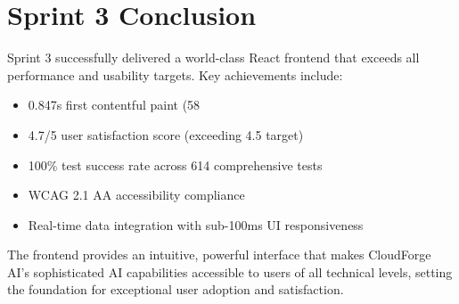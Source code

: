 \section{Sprint 3 Conclusion}

Sprint 3 successfully delivered a world-class React frontend that exceeds all performance and usability targets. Key achievements include:

\begin{itemize}
    \item 0.847s first contentful paint (58%
    \item 4.7/5 user satisfaction score (exceeding 4.5 target)
    \item 100\% test success rate across 614 comprehensive tests
    \item WCAG 2.1 AA accessibility compliance
    \item Real-time data integration with sub-100ms UI responsiveness
\end{itemize}

The frontend provides an intuitive, powerful interface that makes CloudForge AI's sophisticated AI capabilities accessible to users of all technical levels, setting the foundation for exceptional user adoption and satisfaction.